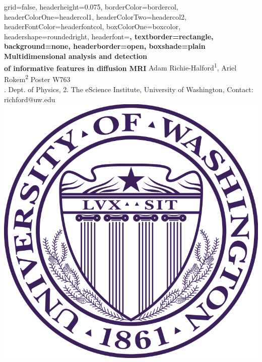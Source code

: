 \documentclass[a0paper,portrait,fontscale=0.395]{baposter}
\begin{document}
\begin{poster}{
grid=false,
headerheight=0.075\textheight,
borderColor=bordercol, %
headerColorOne=headercol1, %
headerColorTwo=headercol2, %
headerFontColor=headerfontcol, %
boxColorOne=boxcolor, %
headershape=roundedright, %
headerfont=\Large\sf\bf, %
textborder=rectangle,
background=none,
headerborder=open, %
boxshade=plain
}
{}
%
%
{\sf\bf Multidimensional analysis and detection \\ of informative features in diffusion MRI} %
{\vspace{0.5em} Adam Richie-Halford\textsuperscript{1}, Ariel Rokem\textsuperscript{2} \hspace{14.2em} Poster W763 \\ %
{. Dept. of Physics, 2. The eScience Institute, University of Washington, Contact: richford@uw.edu}} %
{\includegraphics[scale=0.12]{UWlogo.png}} %
\vspace{-10em}


\end{poster}
\end{document}
